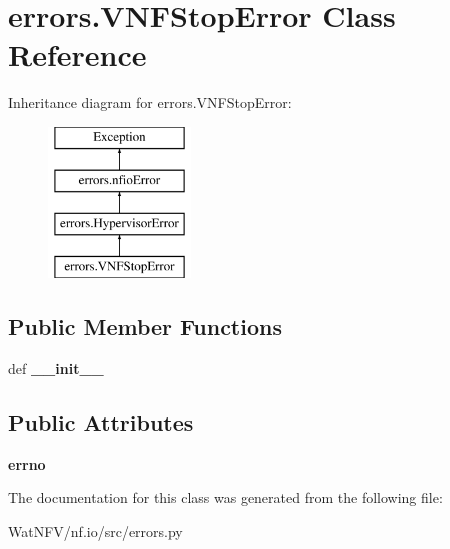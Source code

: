 \hypertarget{classerrors_1_1VNFStopError}{\section{errors.\-V\-N\-F\-Stop\-Error Class Reference}
\label{classerrors_1_1VNFStopError}
}
Inheritance diagram for errors.\-V\-N\-F\-Stop\-Error\-:\begin{figure}[H]
\begin{center}
\leavevmode
\includegraphics[height=4.000000cm]{classerrors_1_1VNFStopError}
\end{center}
\end{figure}
\subsection*{Public Member Functions}
\begin{DoxyCompactItemize}
\item 
\hypertarget{classerrors_1_1VNFStopError_ae71739f032a7cf54847bdd2141003fec}{def {\bfseries \-\_\-\-\_\-init\-\_\-\-\_\-}}\label{classerrors_1_1VNFStopError_ae71739f032a7cf54847bdd2141003fec}

\end{DoxyCompactItemize}
\subsection*{Public Attributes}
\begin{DoxyCompactItemize}
\item 
\hypertarget{classerrors_1_1VNFStopError_af1d4261289c681c59ebd21fedb30011e}{{\bfseries errno}}\label{classerrors_1_1VNFStopError_af1d4261289c681c59ebd21fedb30011e}

\end{DoxyCompactItemize}


The documentation for this class was generated from the following file\-:\begin{DoxyCompactItemize}
\item 
Wat\-N\-F\-V/nf.\-io/src/errors.\-py\end{DoxyCompactItemize}
